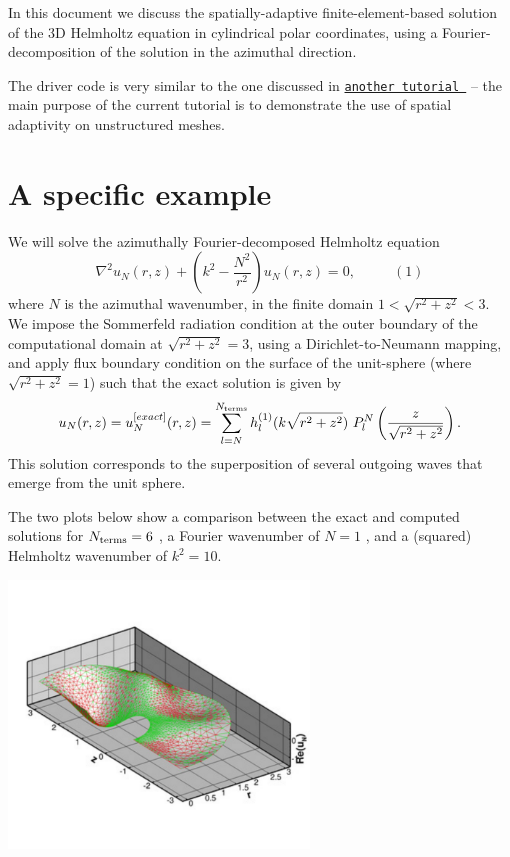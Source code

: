 In this document we discuss the spatially-\/adaptive finite-\/element-\/based solution of the 3D Helmholtz equation in cylindrical polar coordinates, using a Fourier-\/decomposition of the solution in the azimuthal direction.

The driver code is very similar to the one discussed in \href{../../sphere_scattering/html/index.html}{\tt another tutorial } -- the main purpose of the current tutorial is to demonstrate the use of spatial adaptivity on unstructured meshes.



 

\hypertarget{index_scattering}{}\section{A specific example}\label{index_scattering}
We will solve the azimuthally Fourier-\/decomposed Helmholtz equation \[ \nabla^2 {u_{N}}(r,z) + \left(k^2-\frac{N^2}{r^2}\right) u_N(r,z) = 0, \ \ \ \ \ \ \ \ \ \ \ \ (1) \] where $ N $ is the azimuthal wavenumber, in the finite domain $ 1 < \sqrt{r^2 + z^2} < 3 $. We impose the Sommerfeld radiation condition at the outer boundary of the computational domain at $ \sqrt{r^2 + z^2} = 3$, using a Dirichlet-\/to-\/\+Neumann mapping, and apply flux boundary condition on the surface of the unit-\/sphere (where $ \sqrt{r^2 + z^2} = 1 $) such that the exact solution is given by \[ u_N(r,z)=u_N^{[exact]}(r,z)=\sum_{l=N}^{N_{\rm terms}} h_{l}^{(1)}(k\sqrt{r^2+z^2}) \ P_{l}^{N}\left(\frac{z}{\sqrt{r^2+z^2}}\right). \] This solution corresponds to the superposition of several outgoing waves that emerge from the unit sphere.

The two plots below show a comparison between the exact and computed solutions for $ N_{\rm terms}=6 $ , a Fourier wavenumber of $ N=1 $ , and a (squared) Helmholtz wavenumber of $ k^2 = 10 $.

 
\begin{DoxyImage}
\includegraphics[width=0.6\textwidth]{re}
\end{DoxyImage}


